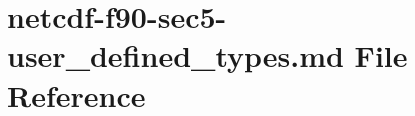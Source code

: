\hypertarget{netcdf-f90-sec5-user__defined__types_8md}{}\section{netcdf-\/f90-\/sec5-\/user\+\_\+defined\+\_\+types.md File Reference}
\label{netcdf-f90-sec5-user__defined__types_8md}
